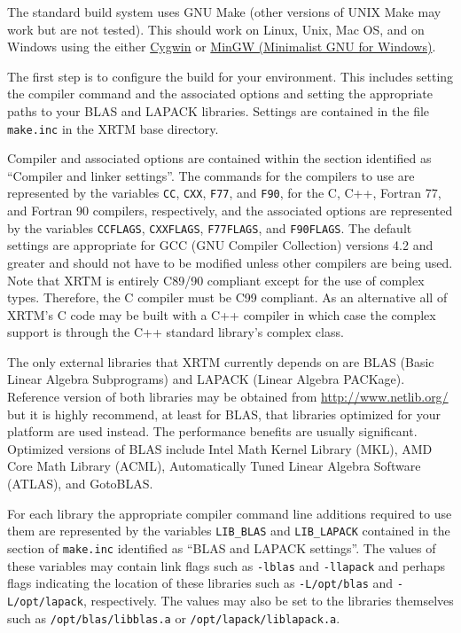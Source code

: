\label{building_and_using_xrtm_building_xrtm}


\label{building_and_using_xrtm_building_xrtm_gnu_make}

The standard build system uses GNU Make (other versions of UNIX Make may work but are not tested).  This should work on Linux, Unix, Mac OS, and on Windows using the either \href{http://www.cygwin.com/}{Cygwin} or \href{http://www.mingw.org/}{MinGW (Minimalist GNU for Windows)}.

The first step is to configure the build for your environment.  This includes setting the compiler command and the associated options and setting the appropriate paths to your BLAS and LAPACK libraries.  Settings are contained in the file \texttt{make.inc} in the XRTM base directory. 

Compiler and associated options are contained within the section identified as ``Compiler and linker settings''.  The commands for the compilers to use are represented by the variables \texttt{CC}, \texttt{CXX}, \texttt{F77}, and \texttt{F90}, for the C, C++, Fortran 77, and Fortran 90 compilers, respectively, and the associated options are represented by the variables \texttt{CCFLAGS}, \texttt{CXXFLAGS}, \texttt{F77FLAGS}, and \texttt{F90FLAGS}.  The default settings are appropriate for GCC (GNU Compiler Collection) versions 4.2 and greater and should not have to be modified unless other compilers are being used.  Note that XRTM is entirely C89/90 compliant except for the use of complex types.  Therefore, the C compiler must be C99 compliant.  As an alternative all of XRTM's C code may be built with a C++ compiler in which case the complex support is through the C++ standard library's complex class.

The only external libraries that XRTM currently depends on are BLAS (Basic Linear Algebra Subprograms) and LAPACK (Linear Algebra PACKage).  Reference version of both libraries may be obtained from \url{http://www.netlib.org/} but it is highly recommend, at least for BLAS, that libraries optimized for your platform are used instead.  The performance benefits are usually significant.  Optimized versions of BLAS include Intel Math Kernel Library (MKL), AMD Core Math Library (ACML), Automatically Tuned Linear Algebra Software (ATLAS), and GotoBLAS.  

For each library the appropriate compiler command line additions required to use them are represented by the variables \texttt{LIB\_BLAS} and \texttt{LIB\_LAPACK} contained in the section of \texttt{make.inc} identified as ``BLAS and LAPACK settings''.  The values of these variables may contain link flags such as \texttt{-lblas} and \texttt{-llapack} and perhaps flags indicating the location of these libraries such as \texttt{-L/opt/blas} and \texttt{-L/opt/lapack}, respectively.  The values may also be set to the libraries themselves such as \texttt{/opt/blas/libblas.a} or \texttt{/opt/lapack/liblapack.a}.

